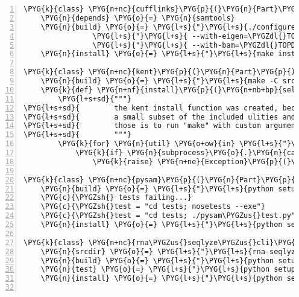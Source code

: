 \begin{Verbatim}[commandchars=\\\{\},numbers=left,firstnumber=1,stepnumber=5]
\PYG{k}{class} \PYG{n+nc}{cufflinks}\PYG{p}{(}\PYG{n}{Part}\PYG{p}{)}\PYG{p}{:}
    \PYG{n}{depends} \PYG{o}{=} \PYG{n}{samtools}
    \PYG{n}{build} \PYG{o}{=} \PYG{l+s}{"}\PYG{l+s}{./configure --prefix=\PYGZdl{}PREFIX}\PYG{l+s}{"}       \PYGZbs{}
                \PYG{l+s}{"}\PYG{l+s}{ --with-eigen=\PYGZdl{}TOPDIR/src/eigen}\PYG{l+s}{"} \PYGZbs{}
                \PYG{l+s}{"}\PYG{l+s}{ --with-bam=\PYGZdl{}TOPDIR/src/samtools \&\& make}\PYG{l+s}{"}
    \PYG{n}{install} \PYG{o}{=} \PYG{l+s}{"}\PYG{l+s}{make install}\PYG{l+s}{"}

\PYG{k}{class} \PYG{n+nc}{kent}\PYG{p}{(}\PYG{n}{Part}\PYG{p}{)}\PYG{p}{:}
    \PYG{n}{build} \PYG{o}{=} \PYG{l+s}{"}\PYG{l+s}{make -C src/lib}\PYG{l+s}{"}
    \PYG{k}{def} \PYG{n+nf}{install}\PYG{p}{(}\PYG{n+nb+bp}{self}\PYG{p}{)}\PYG{p}{:}
        \PYG{l+s+sd}{"""}
\PYG{l+s+sd}{        the kent install function was created, because rna-seqlyze need only}
\PYG{l+s+sd}{        a small subset of the included ulities and the easiest way to build}
\PYG{l+s+sd}{        those is to run "make" with custom arguments for each one of them}
\PYG{l+s+sd}{        """}
        \PYG{k}{for} \PYG{n}{util} \PYG{o+ow}{in} \PYG{l+s}{"}\PYG{l+s}{wigToBigWig bedToBigBed}\PYG{l+s}{"}\PYG{o}{.}\PYG{n}{split}\PYG{p}{(}\PYG{l+s}{"}\PYG{l+s}{ }\PYG{l+s}{"}\PYG{p}{)}\PYG{p}{:}
            \PYG{k}{if} \PYG{n}{subprocess}\PYG{o}{.}\PYG{n}{call}\PYG{p}{(}\PYG{l+s}{"}\PYG{l+s}{make -C src/utils/}\PYG{l+s}{"} \PYG{o}{+} \PYG{n}{util}\PYG{p}{,} \PYG{n}{shell}\PYG{o}{=}\PYG{n+nb+bp}{True}\PYG{p}{)} \PYG{o}{!=} \PYG{l+m+mi}{0}\PYG{p}{:}
                \PYG{k}{raise} \PYG{n+ne}{Exception}\PYG{p}{(}\PYG{l+s}{"}\PYG{l+s}{kent.install(): couldn}\PYG{l+s}{'}\PYG{l+s}{t install }\PYG{l+s}{'}\PYG{l+s+si}{\PYGZpc{}s}\PYG{l+s}{'}\PYG{l+s}{"} \PYG{o}{\PYGZpc{}} \PYG{n}{util}\PYG{p}{)}

\PYG{k}{class} \PYG{n+nc}{pysam}\PYG{p}{(}\PYG{n}{Part}\PYG{p}{)}\PYG{p}{:}
    \PYG{n}{build} \PYG{o}{=} \PYG{l+s}{"}\PYG{l+s}{python setup.py build}\PYG{l+s}{"}
    \PYG{c}{\PYGZsh{} tests failing...}
    \PYG{c}{\PYGZsh{}test = "cd tests; nosetests --exe"}
    \PYG{c}{\PYGZsh{}test = "cd tests; ./pysam\PYGZus{}test.py"}
    \PYG{n}{install} \PYG{o}{=} \PYG{l+s}{"}\PYG{l+s}{python setup.py install --prefix=\PYGZdl{}PREFIX}\PYG{l+s}{"}

\PYG{k}{class} \PYG{n+nc}{rna\PYGZus{}seqlyze\PYGZus{}cli}\PYG{p}{(}\PYG{n}{Part}\PYG{p}{)}\PYG{p}{:}
    \PYG{n}{srcdir} \PYG{o}{=} \PYG{l+s}{"}\PYG{l+s}{rna-seqlyze-cli}\PYG{l+s}{"}
    \PYG{n}{build} \PYG{o}{=} \PYG{l+s}{"}\PYG{l+s}{python setup.py build}\PYG{l+s}{"}
    \PYG{n}{test} \PYG{o}{=} \PYG{l+s}{"}\PYG{l+s}{python setup.py test}\PYG{l+s}{"}
    \PYG{n}{install} \PYG{o}{=} \PYG{l+s}{"}\PYG{l+s}{python setup.py develop --prefix=\PYGZdl{}PREFIX}\PYG{l+s}{"}


\end{Verbatim}
